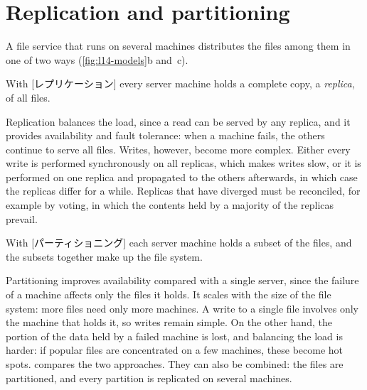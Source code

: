 \documentclass[../main.tex]{subfiles}
\begin{document}
\section{Replication and partitioning}
\label{sec:l14-replication}

A file service that runs on several machines distributes the files among
them in one of two ways (\cref{fig:l14-models}b and~c).

\begin{definition}[Replication]
  With [レプリケーション] every server machine holds a
  complete copy, a \emph{replica}, of all files.
\end{definition}

Replication balances the load, since a read can be served by any replica,
and it provides availability and fault tolerance: when a machine fails,
the others continue to serve all files.  Writes, however, become more
complex.  Either every write is performed synchronously on all replicas,
which makes writes slow, or it is performed on one replica and propagated
to the others afterwards, in which case the replicas differ for a while.
Replicas that have diverged must be reconciled, for example by voting, in
which the contents held by a majority of the replicas prevail.

\begin{definition}[Partitioning]
  With [パーティショニング] each server machine holds a
  subset of the files, and the subsets together make up the file system.
\end{definition}

Partitioning improves availability compared with a single server, since
the failure of a machine affects only the files it holds.  It scales with
the size of the file system: more files need only more
machines.
A write
to a single file involves only the machine that holds it, so writes remain
simple.  On the other hand, the portion of the data held by a failed
machine is lost, and balancing the load is harder: if popular files are
concentrated on a few machines, these become hot spots.
 compares the two approaches.  They can also be
combined: the files are partitioned, and every partition is replicated on
several machines.%
\begin{marginfigure}
  \centering
  
  \caption{Two partitions, each replicated on two machines.}
  \label{fig:l14-combined}
\end{marginfigure}
\end{document}
